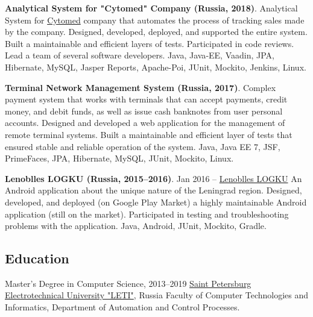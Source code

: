 \documentclass{vl}
\begin{document}
    \textbf{Analytical System for "Cytomed" Company (Russia, 2018)}.
    Analytical System for \href{https://cytomed.ru/en/}{Cytomed} company that automates the process of tracking sales
    made by the company.
    Designed, developed, deployed, and supported the entire system.
    Built a maintainable and efficient layers of tests.
    Participated in code reviews.
    Lead a team of several software developers.
    Java, Java‐EE, Vaadin, JPA, Hibernate, MySQL, Jasper Reports, Apache-Poi, JUnit, Mockito, Jenkins, Linux.

    \textbf{Terminal Network Management System (Russia, 2017)}.
    Complex payment system that works with terminals that can accept payments, credit money, and debit funds,
    as well as issue cash banknotes from user personal accounts.
    Designed and developed a web application for the management of remote terminal systems.
    Built a maintainable and efficient layer of tests that ensured stable and reliable operation of the system.
    Java, Java EE 7, JSF, PrimeFaces, JPA, Hibernate, MySQL, JUnit, Mockito, Linux.

    \textbf{Lenoblles LOGKU (Russia, 2015--2016)}.
    Jan 2016 – \href{https://play.google.com/store/apps/details?id=com.altinntech.oopt_lo}{Lenoblles LOGKU}
    An Android application about the unique nature of the Leningrad region.
    Designed, developed, and deployed (on Google Play Market) a highly maintainable Android application
    (still on the market).
    Participated in testing and troubleshooting problems with the application.
    Java, Android, JUnit, Mockito, Gradle.

    \subsection*{Education}
    \begin{samepage}
        Master's Degree in Computer Science, 2013--2019\newline
        \href{https://etu.ru/en/university/}{Saint Petersburg Electrotechnical University "LETI"}, Russia\newline
        Faculty of Computer Technologies and Informatics, Department of Automation and Control Processes.
    \end{samepage}
\end{document}
